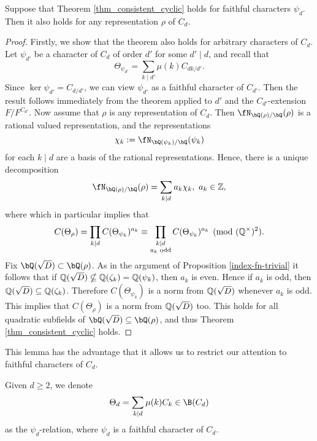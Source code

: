 \begin{lemma}
    Suppose that Theorem \ref{thm_consistent_cyclic} holds for faithful characters $\psi_d$. Then it also holds for any representation $\rho$ of $C_d$.
\end{lemma}
\begin{proof}
    Firstly, we show that the theorem also holds for arbitrary characters of $C_d$. Let $\psi_{d'}$ be a character of $C_d$ of order $d'$ for some $d'\mid d$, and recall that 
    $$\Theta_{\psi_{d'}}=\sum_{k\mid d'}\mu(k)C_{dk/d'}.$$ Since $\ker\psi_{d'}=C_{d/d'}$, we can view $\psi_{d'}$ as a faithful character of $C_{d'}$. Then the result follows immediately from the theorem applied to ${d'}$ and the $C_{d'}$-extension $F/F^{C_{d'}}$.
    Now assume that $\rho$ is any representation of $C_d$. Then $\repnorm{\rho}$ is a rational valued representation, and the representations
    $$\chi_k:=\repnorm{\psi_k}$$
    for each $k\mid d$ are a basis of the rational representations. Hence, there is a unique decomposition
    $$\repnorm{\rho}=\sum_{k\mid d}a_k\chi_k,\ a_k\in\ZZ,$$
    where
    which in particular implies that 
    $$C(\Theta_\rho)=\prod_{k\mid d}C(\Theta_{\psi_k})^{a_k}\equiv \prod_{\substack{k\mid d \\ a_k\text{ odd}} }C(\Theta_{\psi_k})^{a_k}\pmod{(\mathbb{Q}^{\times})^2}.$$
    Fix $\bQ(\sqrt{D}) \subset \bQ(\rho)$. As in the argument of Proposition \ref{index-fn-trivial} it follows that if $\mathbb{Q}(\sqrt{D})\nsubseteq \mathbb{Q}(\zeta_k)=\mathbb{Q}(\psi_k)$, then $a_k$ is even. Hence if $a_k$ is odd, then $\mathbb{Q}(\sqrt{D})\subseteq\mathbb{Q}(\zeta_k)$. Therefore $C(\Theta_{\psi_k})$ is a norm from $\mathbb{Q}(\sqrt{D})$ whenever $a_k$ is odd. This implies that $C(\Theta_\rho)$ is a norm from $\mathbb{Q}(\sqrt{D})$ too. This holds for all quadratic subfields of $ \bQ(\sqrt{D}) \subseteq \bQ(\rho)$, and thus Theorem \ref{thm_consistent_cyclic} holds.
\end{proof}

This lemma has the advantage that it allows us to restrict our attention to faithful characters of $C_d$. 

\begin{notation}
    Given $d \geq 2$, we denote $$\Theta_d=\sum_{k\mid d}\mu(k)C_k\in \B(C_d)$$ as the $\psi_d$-relation, where $\psi_d$ is a faithful character of $C_d$.
\end{notation}


